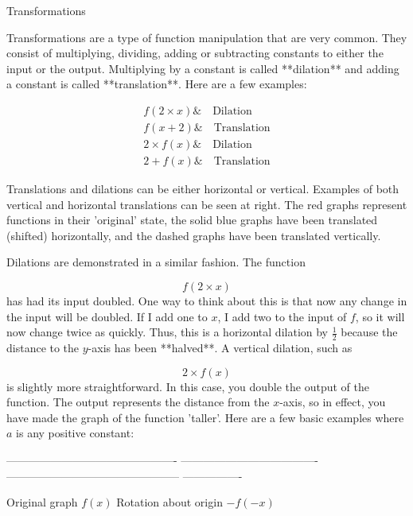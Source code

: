 Transformations



Transformations are a type of function manipulation that are very common. They consist of
multiplying, dividing, adding or subtracting constants to either the input or the output.
Multiplying by a constant is called **dilation** and adding a constant is called
**translation**. Here are a few examples:



\begin{align} f(2 \times x) \& \quad \text{Dilation} \\ f(x + 2) \& \quad \text{Translation} \\ 2 \times f(x) \& \quad \text{Dilation} \\ 2 + f(x) \& \quad \text{Translation} \end{align}





Translations and dilations can be either horizontal or vertical. Examples of both vertical
and horizontal translations can be seen at right. The red graphs represent functions in
their 'original' state, the solid blue graphs have been translated (shifted) horizontally,
and the dashed graphs have been translated vertically.



Dilations are demonstrated in a similar fashion. The function



$$f(2\times x)$$ has had its input doubled. One way to think about this is that now any
change in the input will be doubled. If I add one to $x$, I add two to the input of $f$,
so it will now change twice as quickly. Thus, this is a horizontal dilation by
$\frac{1}{2}$ because the distance to the $y$-axis has been **halved**. A vertical
dilation, such as



$$2\times f(x)$$ is slightly more straightforward. In this case, you double the output of
the function. The output represents the distance from the $x$-axis, so in effect, you have
made the graph of the function 'taller'. Here are a few basic examples where $a$ is any
positive constant:



  ---------------------------------------------- -------------------------------------
  ----------------------------------------------- ----------------

  Original graph                                 $f(x)$
  Rotation about origin                           $-f(-x)$

